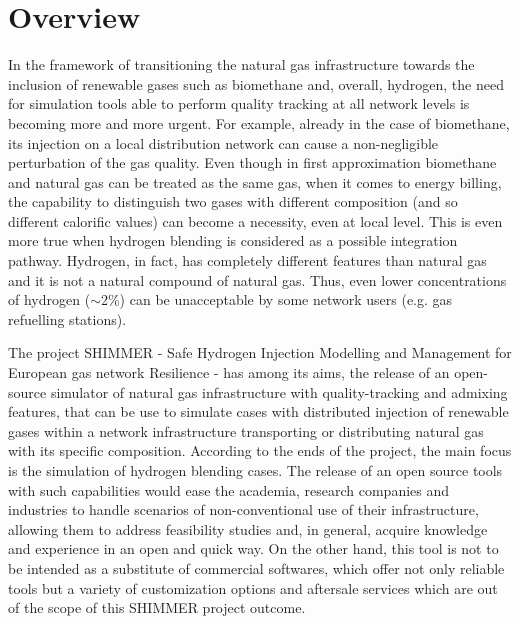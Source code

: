 \clearpage
\section{Overview}
In the framework of transitioning the natural gas infrastructure towards the inclusion of renewable gases such as biomethane and, overall, hydrogen, the need for simulation tools able to perform quality tracking at all network levels is becoming more and more urgent. For example, already in the case of biomethane, its injection on a local distribution network can cause a non-negligible perturbation of the gas quality. Even though in first approximation biomethane and natural gas can be treated as the same gas, when it comes to energy billing, the capability to distinguish two gases with different composition (and so different calorific values) can become a necessity, even at local level. This is even more true when hydrogen blending is considered as a possible integration pathway. Hydrogen, in fact, has completely different features than natural gas and it is not a natural compound of natural gas. Thus, even lower concentrations of hydrogen ($\sim2$\%) can be unacceptable by some network users (e.g. gas refuelling stations).

The project SHIMMER - Safe Hydrogen Injection Modelling and Management for European gas network Resilience - has among its aims, the release of an open-source simulator of natural gas infrastructure with quality-tracking and admixing features, that can be use to simulate cases with distributed injection of renewable gases within a network infrastructure transporting or distributing natural gas with its specific composition. According to the ends of the project, the main focus is the simulation of hydrogen blending cases. 
The release of an open source tools with such capabilities would ease the academia, research companies and industries to handle scenarios of non-conventional use of their infrastructure, allowing them to address feasibility studies and, in general, acquire knowledge and experience in an open and quick way. On the other hand, this tool is not to be intended as a substitute of commercial softwares, which offer not only reliable tools but a variety of customization options and aftersale services which are out of the scope of this SHIMMER project outcome.

